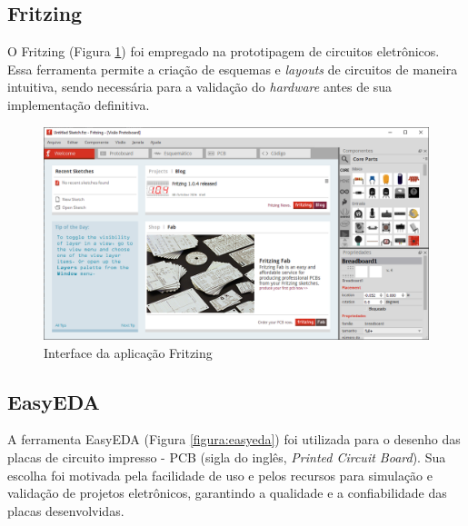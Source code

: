 \subsection{Fritzing}
O Fritzing (Figura \ref{figura:fritzing}) foi empregado na prototipagem de circuitos eletrônicos. Essa ferramenta permite a criação de esquemas e \textit{layouts} de circuitos de maneira intuitiva, sendo necessária para a validação do \textit{hardware} antes de sua implementação definitiva.

\begin{figure}[!htb] \centering
  \caption{Interface da aplicação Fritzing} \label{figura:fritzing}
  \begin{varwidth}{\linewidth}
    \includegraphics[width=16cm]{figuras/fritzing.png}
  \end{varwidth}
\end{figure}

\subsection{EasyEDA}
A ferramenta EasyEDA (Figura \ref{figura:easyeda}) foi utilizada para o desenho das placas de circuito impresso - PCB (sigla do inglês, \textit{Printed Circuit Board}). Sua escolha foi motivada pela facilidade de uso e pelos recursos para simulação e validação de projetos eletrônicos, garantindo a qualidade e a confiabilidade das placas desenvolvidas.

